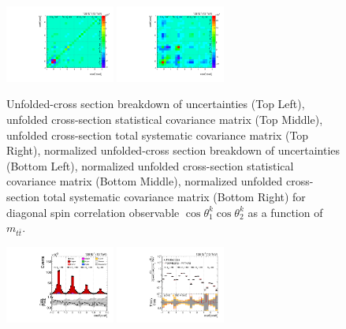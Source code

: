 \begin{refsection}
\begin{figure}[htb]
\begin{center}
 \includegraphics[width=0.32\textwidth]{fig_fullRun2UL/unfolding/combined/StatCovMatrixNorm_rebinnedB_c_kk_mttbar.pdf}
 \includegraphics[width=0.32\textwidth]{fig_fullRun2UL/unfolding/combined/TotalSystCovMatrixNorm_rebinnedB_c_kk_mttbar.pdf} \\
\caption{Unfolded-cross section breakdown of uncertainties (Top Left), unfolded cross-section statistical covariance matrix (Top Middle), unfolded cross-section total systematic covariance matrix (Top Right), normalized unfolded-cross section breakdown of uncertainties (Bottom Left), normalized unfolded cross-section statistical covariance matrix (Bottom Middle), normalized unfolded cross-section total systematic covariance matrix (Bottom Right) for diagonal spin correlation observable $\cos\theta_{1}^{k}\cos\theta_{2}^{k}$ as a function of $m_{t\bar{t}}$.}
\label{fig:c_kk_mttbar_uncertainties}
\end{center}
\end{figure}
\clearpage
\begin{figure}[htb]
\begin{center}
 \includegraphics[width=0.32\textwidth]{fig_fullRun2UL/controlplots/combined/Hyp_LLBarCrr_vs_TTBarMass.pdf}
 \includegraphics[width=0.32\textwidth]{fig_fullRun2UL/unfolding/combined/UnfoldedResults_c_rr_mttbar.pdf}

\end{center}
\end{figure}
\end{refsection}
